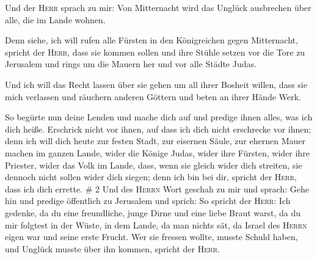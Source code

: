  Und der \textsc{Herr} sprach zu mir: Von Mitternacht
wird das Unglück ausbrechen über alle, die im Lande wohnen.

 Denn siehe, ich will rufen alle Fürsten in den
Königreichen gegen Mitternacht, spricht der \textsc{Herr}, dass sie
kommen sollen und ihre Stühle setzen vor die Tore zu Jerusalem und rings
um die Mauern her und vor alle Städte Judas.

 Und ich will das Recht lassen über sie gehen um all
ihrer Bosheit willen, dass sie mich verlassen und räuchern anderen
Göttern und beten an ihrer Hände Werk.

 So begürte nun deine Lenden und mache dich auf und
predige ihnen alles, was ich dich heiße. Erschrick nicht vor ihnen, auf
dass ich dich nicht erschrecke vor ihnen;  denn ich will
dich heute zur festen Stadt, zur eisernen Säule, zur ehernen Mauer
machen im ganzen Lande, wider die Könige Judas, wider ihre Fürsten,
wider ihre Priester, wider das Volk im Lande,  dass, wenn
sie gleich wider dich streiten, sie dennoch nicht sollen wider dich
siegen; denn ich bin bei dir, spricht der \textsc{Herr}, dass ich dich
errette. \# 2  Und des \textsc{Herrn} Wort geschah zu mir
und sprach:  Gehe hin und predige öffentlich zu Jerusalem
und sprich: So spricht der \textsc{Herr}: Ich gedenke, da du eine
freundliche, junge Dirne und eine liebe Braut warst, da du mir folgtest
in der Wüste, in dem Lande, da man nichts sät,  da Israel
des \textsc{Herrn} eigen war und seine erste Frucht. Wer sie fressen
wollte, musste Schuld haben, und Unglück musste über ihn kommen, spricht
der \textsc{Herr}.

